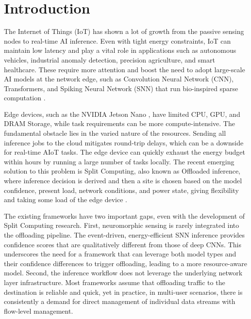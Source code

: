 \documentclass[journal]{IEEEtran}
\begin{document}
\section{Introduction}
\label{sec:intro}
The Internet of Things (IoT) has shown a lot of growth from the passive sensing nodes to real-time AI inference. Even with tight energy constraints, IoT can maintain low latency and play a vital role in applications such as autonomous vehicles, industrial anomaly detection, precision agriculture, and smart healthcare. These require more attention and boost the need to adopt large-scale AI models at the network edge, such as Convolution Neural Network (CNN), Transformers, and Spiking Neural Network (SNN) that run bio-inspired sparse computation \cite{shi2016edge,satyanarayanan2017emergence,mach2017mobile,mao2017survey,feng2022computation,al2021deep}.

Edge devices, such as the NVIDIA Jetson Nano \cite{nano2025nvidia}, have limited CPU, GPU, and DRAM Storage, while task requirements can be more compute-intensive. The fundamental obstacle lies in the varied nature of the resources. Sending all inference jobs to the cloud mitigates round-trip delays, which can be a downside for real-time AIoT tasks. The edge device can quickly exhaust the energy budget within hours by running a large number of tasks locally. The recent emerging solution to this problem is Split Computing, also known as Offloaded inference, where inference decision is derived and then a site is chosen based on the model confidence, present load, network conditions, and power state, giving flexibility and taking some load of the edge device \cite{teerapittayanon2017distributed,chang2021survey,10534618,karjee2022split,wang2024end}.

The existing frameworks have two important gaps, even with the development of Split Computing research. First, neuromorphic sensing is rarely integrated into the offloading pipeline. The event-driven, energy-efficient SNN inference provides confidence scores that are qualitatively different from those of deep CNNs. This underscores the need for a framework that can leverage both model types and their confidence differences to trigger offloading, leading to a more resource-aware model. Second, the inference workflow does not leverage the underlying network layer infrastructure. Most frameworks assume that offloading traffic to the destination is reliable and quick, yet in practice, in multi-user scenarios, there is consistently a demand for direct management of individual data streams with flow-level management.
\end{document}
